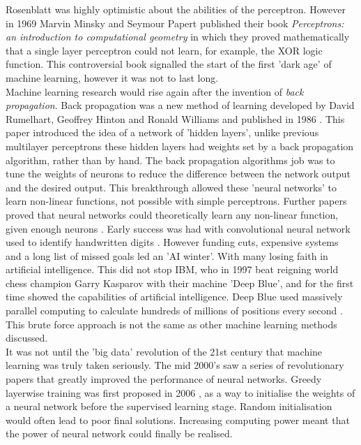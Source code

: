 Rosenblatt was highly optimistic about the abilities of the perceptron. However in 1969 Marvin Minsky and Seymour Papert published their book \textit{Perceptrons: an introduction to computational geometry} \cite{Minsky1969Perceptrons:Geometry} in which they proved mathematically that a single layer perceptron could not learn, for example, the XOR logic function. This controversial book signalled the start of the first 'dark age' of machine learning, however it was not to last long.\\
Machine learning research would rise again after the invention of \textit{back propagation}. Back propagation was a new method of learning developed by David Rumelhart, Geoffrey Hinton  and Ronald Williams and published in 1986 \cite{Rumelhart1986LearningErrors}. This paper introduced the idea of a network of 'hidden layers', unlike previous multilayer perceptrons these hidden layers had weights set by a back propagation algorithm, rather than by hand. The back propagation algorithms job was to tune the weights of neurons to reduce the difference between the network output and the desired output. This breakthrough allowed these 'neural networks' to learn non-linear functions, not possible with simple perceptrons. Further papers proved that neural networks could theoretically learn any non-linear function, given enough neurons \cite{Hornik1991ApproximationNetworks}. Early success was had with convolutional neural network used to identify handwritten digits \cite{LeCun1990HandwrittenNetwork}. However funding cuts, expensive systems and a long list of missed goals led an 'AI winter'. With many losing faith in artificial intelligence. This did not stop IBM, who in 1997 beat reigning world chess champion Garry Kasparov with their machine 'Deep Blue', and for the first time showed the capabilities of artificial intelligence. Deep Blue used massively parallel computing to calculate hundreds of millions of positions every second \cite{Campbell2002DeepBlue}. This brute force approach is not the same as other machine learning methods discussed.\\
It was not until the 'big data' revolution of the 21st century that machine learning was truly taken seriously. The mid 2000's saw a series of revolutionary papers that greatly improved the performance of neural networks. Greedy layerwise training was first proposed in 2006 \cite{Bengio2006GreedyNetworks}, as a way to initialise the weights of a neural network before the supervised learning stage. Random initialisation would often lead to poor final solutions. Increasing computing power meant that the power of neural network could finally be realised.

